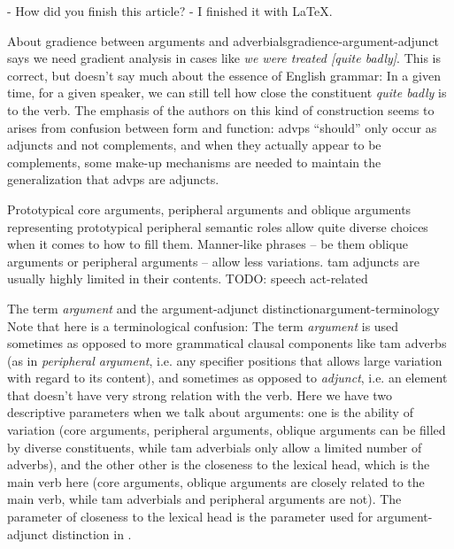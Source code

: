 \documentclass[UTF8, a4paper, oneside, scheme=plain]{ctexrep}
\newcommand*{\citepage}[1]{p.~{#1}}
\newcommand*{\term}[1]{\emph{#1}}
\newcommand{\corpus}[1]{\emph{#1}}
\begin{document}
\begin{exe}
    \ex\label{ex:simple-clause.dependents.ex-3} - How did you finish this article? 
    - I finished it with LaTeX.
\end{exe}

\begin{infobox}{About gradience between arguments and adverbials}{gradience-argument-adjunct}
    \citet[\citepage{732}]{quirk1985} says we need gradient analysis 
    in cases like \corpus{we were treated [quite badly]}.
    This is correct, but doesn't say much about the essence of English grammar:
    In a given time, for a given speaker,
    we can still tell how close the constituent \corpus{quite badly} is to the verb.
    The emphasis of the authors on this kind of construction 
    seems to arises from confusion between form and function:
    \acs{advp}s ``should'' only occur as adjuncts and not complements,
    and when they actually appear to be complements,
    some make-up mechanisms are needed to maintain the generalization that \acs{advp}s are adjuncts.
\end{infobox}

Prototypical core arguments,
peripheral arguments and oblique arguments representing prototypical peripheral semantic roles 
allow quite diverse choices when it comes to how to fill them.
Manner-like phrases -- be them oblique arguments or peripheral arguments -- 
allow less variations.
\acs{tam} adjuncts are usually highly limited in their contents.
TODO: speech act-related



\begin{infobox}{The term \term{argument} and the argument-adjunct distinction}{argument-terminology}
    Note that here is a terminological confusion:
    The term \term{argument} is used sometimes 
    as opposed to more grammatical clausal components like \acs{tam} adverbs
    (as in \term{peripheral argument}, 
    i.e. any specifier positions that allows large variation with regard to its content),
    and sometimes as opposed to \term{adjunct},
    i.e. an element that doesn't have very strong relation with the verb.
    Here we have two descriptive parameters when we talk about arguments:
    one is the ability of variation
    (core arguments, peripheral arguments, oblique arguments can be filled by diverse constituents,
    while \acs{tam} adverbials only allow a limited number of adverbs),
    and the other other is the closeness to the lexical head, which is the main verb here 
    (core arguments, oblique arguments are closely related to the main verb,
    while \acs{tam} adverbials and peripheral arguments are not).
    The parameter of closeness to the lexical head is the parameter used for argument-adjunct distinction
    in .
\end{infobox}
\end{document}
